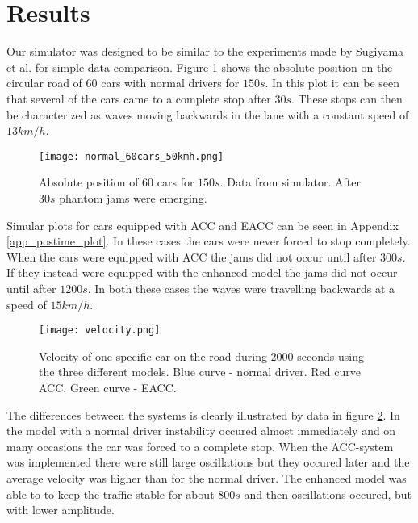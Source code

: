 \section{Results}
Our simulator was designed to be similar to the experiments made by Sugiyama
et al.\cite{sugiyama} for simple data comparison. Figure \ref{normal_postime}
shows the absolute position on the circular road of 60 cars with
normal drivers for $ 150 \unit{s} $. In this plot it can be seen that several
of the cars came to a complete stop after $ 30 \unit{s} $. These stops can
then be characterized as waves \cite{mit} moving backwards in the
lane with a constant speed of $ 13 \unit{km/h} $.

\begin{figure}[h!]
    \begin{center}
    \texttt{[image: normal\_60cars\_50kmh.png]}
    \caption{\label{normal_postime}
Absolute position of 60 cars for $ 150 \unit{s} $. Data from simulator. After
$ 30 \unit{s} $ phantom jams were emerging.}
    \end{center}
\end{figure}
Simular plots for cars equipped with ACC and EACC can be seen in
Appendix \ref{app_postime_plot}. In these cases the cars were never forced to
stop completely. When the cars were equipped with ACC the jams did not occur
until after $ 300 \unit{s} $. If they instead were equipped with the enhanced
model the jams did not occur until after $ 1200 \unit{s} $. In both these
cases the waves were travelling backwards at a speed of $ 15 \unit{km/h} $.

\begin{figure}[h!]
    \begin{center}
    \texttt{[image: velocity.png]}
    \caption{\label{velocity}Velocity of one specific car on the road during
2000 seconds using the three different models. Blue curve - normal driver. Red
curve ACC. Green curve - EACC.}
    \end{center}
\end{figure}
The differences between the systems is clearly illustrated by data in figure
\ref{velocity}. In the model with a normal driver instability occured almost
immediately and on many occasions the car was forced to a complete stop. When
the ACC-system was implemented there were still large oscillations but
they occured later and the average velocity was higher than for the normal
driver. The enhanced model was able to to keep the traffic stable for about $
800 \unit{s} $ and then oscillations occured, but with lower amplitude.

